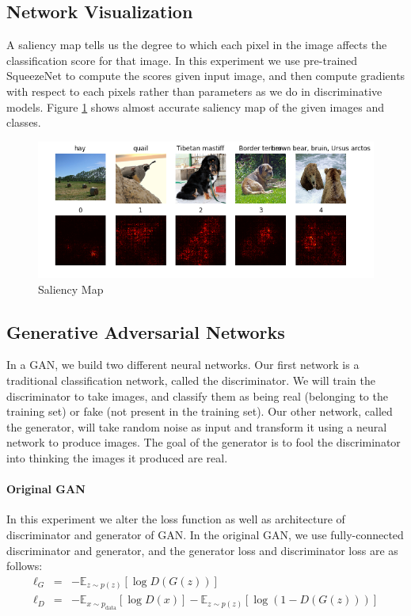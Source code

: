 \documentclass{article} %
\begin{document}
\subsection{Network Visualization}
A saliency map tells us the degree to which each pixel in the image affects the classification score for that image. In this experiment we use pre-trained SqueezeNet to compute the scores given input image, and then compute gradients with respect to each pixels rather than parameters as we do in discriminative models. Figure \ref{fig:saliency-map} shows almost accurate saliency map of the given images and classes.
\begin{figure}[htbp]
	\centering
	\includegraphics[width=.7\textwidth]{saliency.png}
	\caption{Saliency Map}
	\label{fig:saliency-map}
\end{figure}

\subsection{Generative Adversarial Networks} \label{sec:assignment3-gan}
In a GAN, we build two different neural networks. Our first network is a traditional classification network, called the discriminator. We will train the discriminator to take images, and classify them as being real (belonging to the training set) or fake (not present in the training set). Our other network, called the generator, will take random noise as input and transform it using a neural network to produce images. The goal of the generator is to fool the discriminator into thinking the images it produced are real.

\paragraph{Original GAN} In this experiment we alter the loss function as well as architecture of discriminator and generator of GAN. In the original GAN, we use fully-connected discriminator and generator, and the generator loss and discriminator loss are as follows:
\begin{eqnarray*}
	\ell_G  &=&  -\mathbb{E}_{z \sim p(z)}\left[\log D(G(z))\right]\\
	\ell_D &=& -\mathbb{E}_{x \sim p_\text{data}}\left[\log D(x)\right] - \mathbb{E}_{z \sim p(z)}\left[\log \left(1-D(G(z))\right)\right]
\end{eqnarray*}
\end{document}
